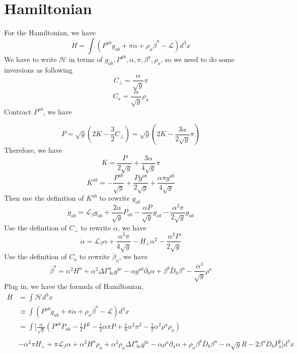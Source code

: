 \documentclass{article}
\begin{document}
\section{Hamiltonian}
For the Hamiltonian, we have
\[
H = \int( P^{ab}{\dot g_{ab}} + \pi {\dot \alpha} + \rho_{a} {\dot \beta^{a}} - \mathscr{L} )d^3 x
\]
We have to write $\mathcal{H}$ in terms of $g_{ab},P^{ab},\alpha,\pi,\beta^{a},\rho_{a}$, so we need to do some inversions as following
\[
\boxed{C_{\perp} = \frac{\alpha}{\sqrt{g}}\pi}
\]
\[
\boxed{C_{a} = \frac{\alpha}{\sqrt{g}}\rho_{a}}
\]
Contract $P^{ab}$, we have

\[
P = \sqrt{g}(2K - \frac{3}{2}C_{\perp}) = \sqrt{g}(2K - \frac{3\alpha}{2\sqrt{g}}\pi)
\]
Therefore, we have
\[
\boxed{K = \frac{P}{2\sqrt{g}} + \frac{3\alpha}{4\sqrt{g}}\pi}
\]
\[
\boxed{
K^{ab} = -\frac{P^{ab}}{\sqrt{g}} + \frac{Pg^{ab}}{2\sqrt{g}} + \frac{\alpha \pi g^{ab}}{4\sqrt{g}}
}
\]
Then use the definition of $K^{ab}$ to rewrite ${\dot g_{ab}}$
\[
\boxed{
{\dot g_{ab}} = \mathcal{L}_{\beta}g_{ab} + \frac{2\alpha}{\sqrt{g}}P_{ab} - \frac{\alpha P}{\sqrt{g}}g_{ab} - \frac{\alpha^2 \pi }{2\sqrt{g}}g_{ab}
}
\]
Use the definition of $C_{\perp}$ to rewrite ${\dot \alpha }$, we have
\[
\boxed{
{\dot \alpha} = \mathcal{L}_{\beta}\alpha + \frac{\alpha^3 \pi}{4 \sqrt{g}} - H_{\perp}\alpha^2 - \frac{\alpha^2 P}{2\sqrt{g}}
}
\]
Use the definition of $C_{a}$ to rewrite ${\dot \beta_{a}}$, we have
\[
\boxed{
{\dot \beta^{a}} = \alpha^2 H^{a} + \alpha^2\Delta \Gamma^{a}_{~bc}g^{bc} - \alpha g^{ab}\partial_{b}\alpha + \beta^{b}{\bar D}_{b}\beta^{a} - \frac{\alpha^3}{\sqrt{g}} \rho^{a}
}
\]
Plug in, we have the formula of Hamiltonian, 
\begin{align*}
H & = \int \mathcal{H} d^3 x \\
&\equiv \int (P^{ab}{\dot g}_{ab} + \pi {\dot \alpha} + \rho_{a}{\dot \beta^{a}} - \mathscr{L} ) d^3x 
\\&= \int [ \frac{\alpha}{\sqrt{g}}(P^{ab}P_{ab} - \frac{1}{2}P^2 - \frac{1}{2}\alpha \pi P + \frac{1}{8}\alpha^2 \pi^2 - \frac{1}{2}\alpha^2 \rho^{a}\rho_{a}) \\
\\
&- \alpha^2 \pi H_{\perp} + \pi \mathcal{L}_{\beta} \alpha + \alpha^2 H^{a}\rho_{a} + \alpha^2 \rho_{a} \Delta \Gamma^{a}_{~bc}g^{bc} - \alpha \rho^{a}\partial_{a} \alpha + \rho_{a}\beta^{b}{\bar D}_{b}\beta^{a} - \alpha \sqrt{g} R - 2\beta^{a}D_{b}P^{b}_{a} ]d^3 x
\end{align*}
\end{document}
